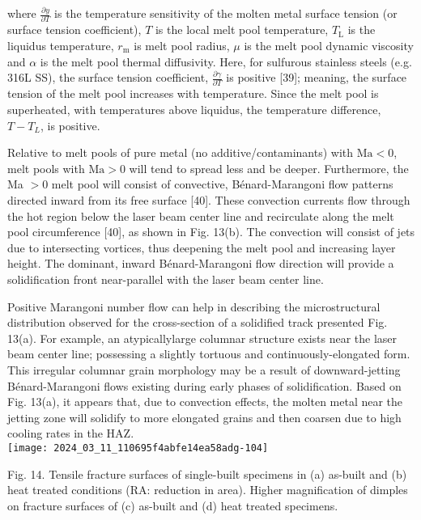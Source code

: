 \documentclass[10pt]{article}
\begin{document}
where $\frac{\partial y}{\partial T}$ is the temperature sensitivity of the molten metal surface tension (or surface tension coefficient), $T$ is the local melt pool temperature, $T_{\mathrm{L}}$ is the liquidus temperature, $r_{\mathrm{m}}$ is melt pool radius, $\mu$ is the melt pool dynamic viscosity and $\alpha$ is the melt pool thermal diffusivity. Here, for sulfurous stainless steels (e.g. 316L SS), the surface tension coefficient, $\frac{\partial \gamma}{\partial T}$ is positive [39]; meaning, the surface tension of the melt pool increases with temperature. Since the melt pool is superheated, with temperatures above liquidus, the temperature difference, $T-T_{L}$, is positive.

Relative to melt pools of pure metal (no additive/contaminants) with $\mathrm{Ma}<0$, melt pools with $\mathrm{Ma}>0$ will tend to spread less and be deeper. Furthermore, the Ma $>0$ melt pool will consist of convective, Bénard-Marangoni flow patterns directed inward from its free surface [40]. These convection currents flow through the hot region below the laser beam center line and recirculate along the melt pool circumference [40], as shown in Fig. 13(b). The convection will consist of jets due to intersecting vortices, thus deepening the melt pool and increasing layer height. The dominant, inward Bénard-Marangoni flow direction will provide a solidification front near-parallel with the laser beam center line.

Positive Marangoni number flow can help in describing the microstructural distribution observed for the cross-section of a solidified track presented Fig. 13(a). For example, an atypicallylarge columnar structure exists near the laser beam center line; possessing a slightly tortuous and continuously-elongated form. This irregular columnar grain morphology may be a result of downward-jetting Bénard-Marangoni flows existing during early phases of solidification. Based on Fig. 13(a), it appears that, due to convection effects, the molten metal near the jetting zone will solidify to more elongated grains and then coarsen due to high cooling rates in the HAZ.\\
\texttt{[image: 2024\_03\_11\_110695f4abfe14ea58adg-104]}

Fig. 14. Tensile fracture surfaces of single-built specimens in (a) as-built and (b) heat treated conditions (RA: reduction in area). Higher magnification of dimples on fracture surfaces of (c) as-built and (d) heat treated specimens.
\end{document}
